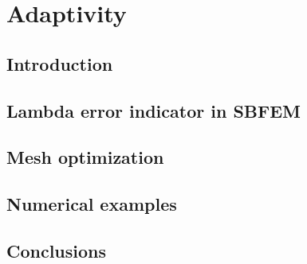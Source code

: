 
\chapter{Adaptivity}

\section{Introduction}

\section{Lambda error indicator in SBFEM}

\section{Mesh optimization}

\section{Numerical examples}

\section{Conclusions}

